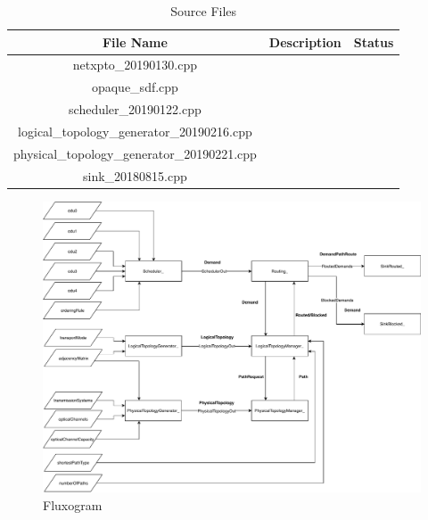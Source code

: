\begin{table}[H]
	\centering
	\begin{tabular}{| c | c | c |}
		\hline
		\textbf{File Name}                          & \textbf{Description} & Status\\ \hline
		netxpto\_20190130.cpp                       &                      &       \\ \hline
		opaque\_sdf.cpp                             &                      &       \\ \hline
		scheduler\_20190122.cpp                     &                      &       \\ \hline
		logical\_topology\_generator\_20190216.cpp  &                      &       \\ \hline
		physical\_topology\_generator\_20190221.cpp &                      &       \\ \hline
		sink\_20180815.cpp                          &                      &       \\ \hline
	\end{tabular}
	\caption{Source Files}
	\label{source_files_opaque}
\end{table}

\newpage
\vspace{20pt}

\begin{figure}[h!]
	\centering
	\includegraphics[width=13cm]{sdf/heuristic/opaque/figures/fluxogram}
	\caption{Fluxogram}
	\label{fluxogram}
\end{figure}

\newpage
\vspace{20pt}

